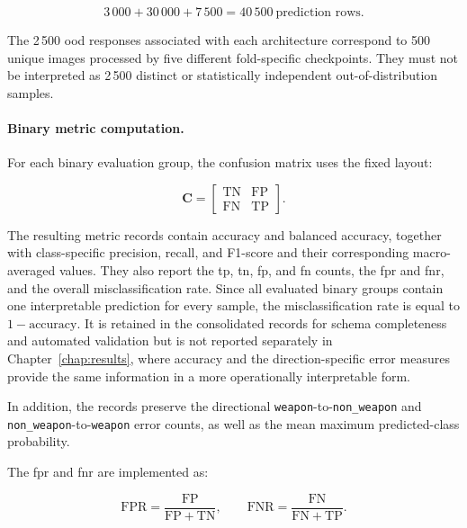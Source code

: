 \begin{equation}
3\,000
+
30\,000
+
7\,500
=
40\,500\ \text{prediction rows}.
\end{equation}

The 2\,500 \gls{ood} responses associated with each architecture correspond to
500 unique images processed by five different fold-specific checkpoints. They
must not be interpreted as 2\,500 distinct or statistically independent
out-of-distribution samples.

\paragraph{Binary metric computation.}

For each binary evaluation group, the confusion matrix uses the fixed layout:

\begin{equation}
\mathbf{C}
=
\begin{bmatrix}
\mathrm{TN} & \mathrm{FP} \\
\mathrm{FN} & \mathrm{TP}
\end{bmatrix}.
\end{equation}

The resulting metric records contain accuracy and balanced accuracy, together
with class-specific precision, recall, and F1-score and their corresponding
macro-averaged values. They also report the \gls{tp}, \gls{tn}, \gls{fp}, and
\gls{fn} counts, the \gls{fpr} and \gls{fnr}, and the overall
misclassification rate. Since all evaluated binary groups contain one
interpretable prediction for every sample, the misclassification rate is equal
to \(1-\mathrm{accuracy}\). It is retained in the consolidated records for
schema completeness and automated validation but is not reported separately in
Chapter~\ref{chap:results}, where accuracy and the direction-specific error
measures provide the same information in a more operationally interpretable
form.

In addition, the records preserve the directional
\texttt{weapon}-to-\texttt{non\_weapon} and
\texttt{non\_weapon}-to-\texttt{weapon} error counts, as well as the mean
maximum predicted-class probability.

The \gls{fpr} and \gls{fnr} are implemented as:

\begin{equation}
\mathrm{FPR}
=
\frac{\mathrm{FP}}
{\mathrm{FP}+\mathrm{TN}},
\qquad
\mathrm{FNR}
=
\frac{\mathrm{FN}}
{\mathrm{FN}+\mathrm{TP}}.
\end{equation}

